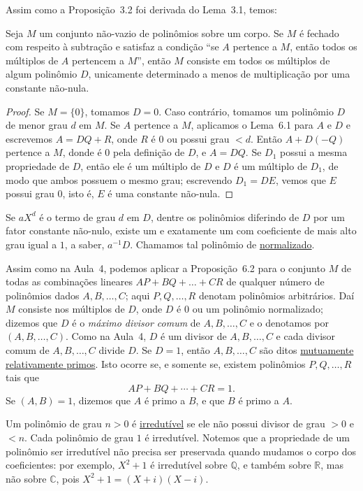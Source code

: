 Assim como a Proposição~3.2 foi derivada do Lema~3.1, temos:

\begin{proposicao}
Seja $M$ um conjunto não-vazio de polinômios sobre um corpo. 
Se $M$ é fechado com respeito à subtração e satisfaz a condição 
``se $A$ pertence a $M$, então todos os múltiplos de $A$ pertencem a $M$'', 
então $M$ consiste em todos os múltiplos de algum polinômio $D$, 
unicamente determinado a menos de multiplicação por uma constante não-nula.
\end{proposicao}

\begin{proof}
Se $M = \{0\}$, tomamos $D = 0$. Caso contrário, tomamos um polinômio $D$ de menor 
grau $d$ em $M$. 
Se $A$ pertence a $M$, aplicamos o Lema~6.1 para $A$ e $D$ e escrevemos
$A = DQ + R$, onde $R$ é $0$ ou possui grau $< d$. 
Então $A + D(-Q) $ pertence a $M$, donde é $0$ pela definição de $D$, 
e $A = DQ$. 
Se $D_1$ possui a mesma propriedade de $D$, então ele é um múltiplo de $D$ 
e $D$ é um múltiplo de $D_1$, de modo que ambos possuem o mesmo grau; 
escrevendo $D_1 = DE$, vemos que $E$ possui grau $0$, isto é, 
$E$ é uma constante não-nula.    
\end{proof}

Se $aX^d$ é o termo de grau $d$ em $D$, dentre os polinômios diferindo de $D$ 
por um fator constante não-nulo, existe um e exatamente um com coeficiente de 
mais alto grau igual a $1$, a saber, $a^{-1}D$. 
Chamamos tal polinômio de \underline{normalizado}.

Assim como na Aula~4, podemos aplicar a Proposição~6.2 para o conjunto $M$ 
de todas as combinações lineares $AP + BQ + \ldots + CR$
de qualquer número de polinômios dados $A, B, \ldots, C$; aqui $P, Q, \ldots, R$ 
denotam polinômios arbitrários. 
Daí $M$ consiste nos múltiplos de $D$, onde $D$ é $0$ ou um polinômio normalizado; 
dizemos que $D$ é o \emph{máximo divisor comum} de $A, B, \ldots, C$ e o denotamos por
$(A,B,\ldots,C)$.
Como na Aula~4, $D$ é um divisor de $A, B, \ldots, C$ e cada divisor comum de 
$A, B, \ldots, C$ divide $D$. 
Se $D = 1$, então $A, B, \ldots, C$ são ditos \underline{mutuamente relativamente primos}. 
Isto ocorre se, e somente se, existem polinômios $P, Q, \ldots, R$ tais que
\[
AP + BQ + \cdots + CR = 1.
\]
Se $(A,B) = 1$, dizemos que $A$ é primo a $B$, e que $B$ é primo a $A$.

Um polinômio de grau $n > 0$ é \underline{irredutível} se ele não possui divisor de grau 
$> 0$ e $< n$. 
Cada polinômio de grau $1$ é irredutível. 
Notemos que a propriedade de um polinômio ser irredutível não precisa ser preservada 
quando mudamos o corpo dos coeficientes: por exemplo, $X^2 + 1$ é irredutível sobre 
$\mathbb{Q}$, e também sobre $\mathbb{R}$, mas não sobre $\mathbb{C}$, pois
$X^2 + 1 = (X + i)(X - i)$.

